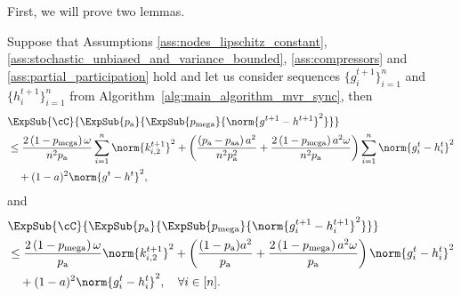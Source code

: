 \documentclass{article}
\newcommand*{\probavailable}{\ensuremath{p_{\textnormal{a}}}}
\newcommand*{\probpairaa}{\ensuremath{p_{\textnormal{aa}}}}
\newcommand*{\probmega}{\ensuremath{p_{\text{mega}}}}
\begin{document}
First, we will prove two lemmas.

\begin{lemma}
  \label{lemma:sync:prob_compressor}
  Suppose that Assumptions \ref{ass:nodes_lipschitz_constant}, \ref{ass:stochastic_unbiased_and_variance_bounded}, \ref{ass:compressors} and \ref{ass:partial_participation} hold and let us consider sequences $\{g^{t+1}_i\}_{i=1}^n$ and $\{h^{t+1}_i\}_{i=1}^n$ from Algorithm~\ref{alg:main_algorithm_mvr_sync}, then
  \begin{align*}
    &\ExpSub{\cC}{\ExpSub{\probavailable}{\ExpSub{\probmega}{\norm{g^{t+1} - h^{t+1}}^2}}} \\
    &\leq \frac{2 \left(1 - \probmega\right) \omega}{n^2 \probavailable}\sum_{i=1}^n\norm{k^{t+1}_{i, 2}}^2 + \left(\frac{\left(\probavailable - \probpairaa\right)a^2}{n^2 \probavailable^2} + \frac{2 \left(1 - \probmega\right) a^2 \omega}{n^2 \probavailable}\right)\sum_{i=1}^n\norm{g^{t}_i - h^{t}_i}^2 \\
    &\quad + (1 - a)^2\norm{g^{t} - h^{t}}^2,
  \end{align*}
  and
  \begin{align*}
    &\ExpSub{\cC}{\ExpSub{\probavailable}{\ExpSub{\probmega}{\norm{g^{t+1}_i - h^{t+1}_i}^2}}} \\
    &\leq \frac{2\left(1 - \probmega\right) \omega}{\probavailable} \norm{k^{t+1}_{i, 2}}^2 + \left(\frac{(1 - \probavailable) a^2}{\probavailable} + \frac{2 \left(1 - \probmega\right) a^2 \omega}{\probavailable}\right)\norm{g^{t}_{i} - h^{t}_{i}}^2 \\
    &\quad + (1 - a)^2 \norm{g^{t}_{i} - h^{t}_{i}}^2, \quad \forall i \in [n].
  \end{align*}
\end{lemma}
\end{document}
